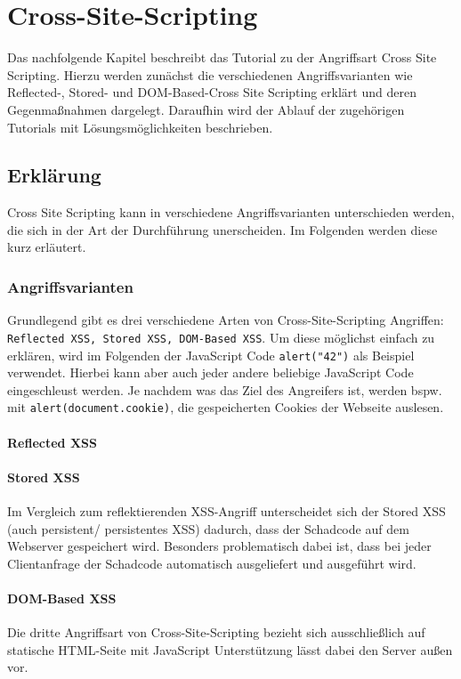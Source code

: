 \chapter{Cross-Site-Scripting}
\label{XSS}
Das nachfolgende Kapitel beschreibt das Tutorial zu der Angriffsart Cross Site Scripting. Hierzu werden zunächst die verschiedenen Angriffsvarianten wie Reflected-, Stored- und DOM-Based-Cross Site Scripting erklärt und deren Gegenmaßnahmen dargelegt. Daraufhin wird der Ablauf der zugehörigen Tutorials mit Lösungsmöglichkeiten beschrieben. 
\section{Erklärung}
Cross Site Scripting kann in verschiedene Angriffsvarianten unterschieden werden, die sich in der Art der Durchführung unerscheiden. Im Folgenden werden diese kurz erläutert. \\ 

\subsection{Angriffsvarianten}
Grundlegend gibt es drei verschiedene Arten von Cross-Site-Scripting Angriffen: \colorbox{altgray}{\lstinline|Reflected XSS, Stored XSS, DOM-Based XSS|}. Um diese möglichst einfach zu erklären, wird im Folgenden der JavaScript Code \colorbox{altgray}{\lstinline|alert("42")|} als Beispiel verwendet. Hierbei kann aber auch jeder andere beliebige JavaScript Code eingeschleust werden. Je nachdem was das Ziel des Angreifers ist, werden bspw. mit \colorbox{altgray}{\lstinline|alert(document.cookie)|}, die gespeicherten Cookies der Webseite auslesen. \\ 
\subsubsection*{Reflected XSS}
\subsubsection*{Stored XSS}
Im Vergleich zum reflektierenden XSS-Angriff unterscheidet sich der Stored XSS (auch persistent/ persistentes XSS) dadurch, dass der Schadcode auf dem Webserver gespeichert wird. Besonders problematisch dabei ist, dass bei jeder Clientanfrage der Schadcode automatisch ausgeliefert und ausgeführt wird. \\ 
\subsubsection*{DOM-Based XSS}
Die dritte Angriffsart von Cross-Site-Scripting bezieht sich ausschließlich auf statische HTML-Seite mit JavaScript Unterstützung lässt dabei den Server außen vor. 
